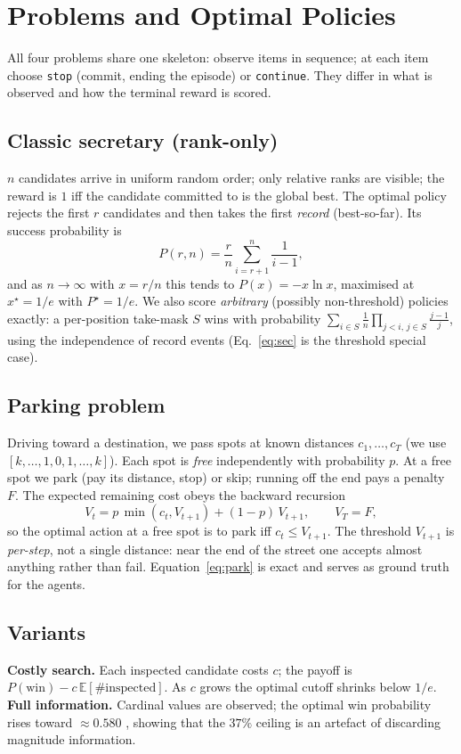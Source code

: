 \section{Problems and Optimal Policies}
All four problems share one skeleton: observe items in sequence; at each item
choose \texttt{stop} (commit, ending the episode) or \texttt{continue}. They
differ in what is observed and how the terminal reward is scored.

\subsection{Classic secretary (rank-only)}
$n$ candidates arrive in uniform random order; only relative ranks are visible;
the reward is $1$ iff the candidate committed to is the global best. The
optimal policy rejects the first $r$ candidates and then takes the first
\emph{record} (best-so-far). Its success probability is
\begin{equation}
P(r,n) = \frac{r}{n}\sum_{i=r+1}^{n}\frac{1}{i-1},
\label{eq:sec}
\end{equation}
and as $n\to\infty$ with $x=r/n$ this tends to $P(x)=-x\ln x$, maximised at
$x^\star=1/e$ with $P^\star=1/e$. We also score \emph{arbitrary} (possibly
non-threshold) policies exactly: a per-position take-mask $S$ wins with
probability $\sum_{i\in S}\tfrac1n\prod_{j<i,\,j\in S}\tfrac{j-1}{j}$, using the
independence of record events (Eq.~\ref{eq:sec} is the threshold special case).

\subsection{Parking problem}
Driving toward a destination, we pass spots at known distances
$c_1,\dots,c_T$ (we use $[k,\dots,1,0,1,\dots,k]$). Each spot is
\emph{free} independently with probability $p$. At a free spot we park (pay its
distance, stop) or skip; running off the end pays a penalty $F$. The expected
remaining cost obeys the backward recursion
\begin{equation}
V_t = p\,\min(c_t, V_{t+1}) + (1-p)\,V_{t+1},\qquad V_{T}=F,
\label{eq:park}
\end{equation}
so the optimal action at a free spot is to park iff $c_t \le V_{t+1}$. The
threshold $V_{t+1}$ is \emph{per-step}, not a single distance: near the end of
the street one accepts almost anything rather than fail. Equation~\ref{eq:park}
is exact and serves as ground truth for the agents.

\subsection{Variants}
\textbf{Costly search.} Each inspected candidate costs $c$; the payoff is
$P(\text{win}) - c\,\mathbb{E}[\#\text{inspected}]$. As $c$ grows the optimal
cutoff shrinks below $1/e$. \textbf{Full information.} Cardinal values are
observed; the optimal win probability rises toward $\approx0.580$
\cite{gilbert1966recognizing}, showing that the $37\%$ ceiling is an artefact
of discarding magnitude information.

